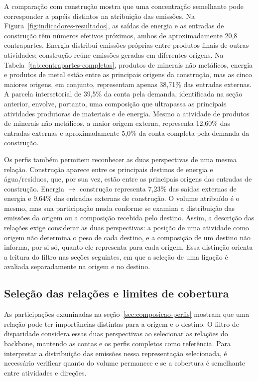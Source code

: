A comparação com construção mostra que uma concentração semelhante pode corresponder a papéis distintos na atribuição das emissões. Na Figura~\ref{fig:indicadores-resultados}, as saídas de energia e as entradas de construção têm números efetivos próximos, ambos de aproximadamente 20,8 contrapartes. Energia distribui emissões próprias entre produtos finais de outras atividades; construção reúne emissões geradas em diferentes origens. Na Tabela~\ref{tab:contrapartes-completas}, produtos de minerais não metálicos, energia e produtos de metal estão entre as principais origens da construção, mas as cinco maiores origens, em conjunto, representam apenas 38,71\% das entradas externas. A parcela intersetorial de 39,5\% da conta pela demanda, identificada na seção anterior, envolve, portanto, uma composição que ultrapassa as principais atividades produtoras de materiais e de energia. Mesmo a atividade de produtos de minerais não metálicos, a maior origem externa, representa 12,60\% das entradas externas e aproximadamente 5,0\% da conta completa pela demanda da construção.

Os perfis também permitem reconhecer as duas perspectivas de uma mesma relação. Construção aparece entre os principais destinos de energia e água/resíduos, que, por sua vez, estão entre as principais origens das entradas de construção. Energia $\rightarrow$ construção representa 7,23\% das saídas externas de energia e 9,64\% das entradas externas de construção. O volume atribuído é o mesmo, mas sua participação muda conforme se examina a distribuição das emissões da origem ou a composição recebida pelo destino. Assim, a descrição das relações exige considerar as duas perspectivas: a posição de uma atividade como origem não determina o peso de cada destino, e a composição de um destino não informa, por si só, quanto ele representa para cada origem. Essa distinção orienta a leitura do filtro nas seções seguintes, em que a seleção de uma ligação é avaliada separadamente na origem e no destino.

\subsection{Seleção das relações e limites de cobertura}

As participações examinadas na seção~\ref{sec:composicao-perfis} mostram que uma relação pode ter importâncias distintas para a origem e o destino. O filtro de disparidade considera essas duas perspectivas ao selecionar as relações do backbone, mantendo as contas e os perfis completos como referência. Para interpretar a distribuição das emissões nessa representação selecionada, é necessário verificar quanto do volume permanece e se a cobertura é semelhante entre atividades e direções.

